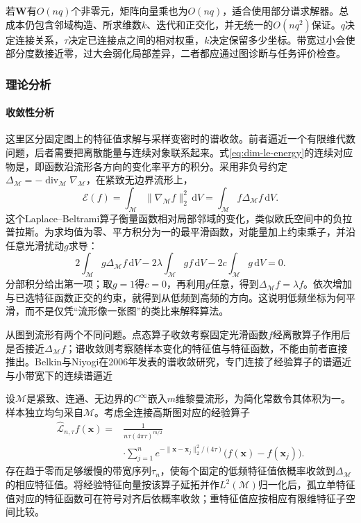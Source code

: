 若$\bm{W}$有$O(nq)$个非零元，矩阵向量乘也为$O(nq)$，适合使用部分谱求解器。总成本仍包含邻域构造、所求维数$k$、迭代和正交化，并无统一的$O(nq^2)$保证。$q$决定连接关系，$\tau$决定已连接点之间的相对权重，$k$决定保留多少坐标。带宽过小会使部分度数接近零，过大会弱化局部差异，二者都应通过图诊断与任务评价检查。

\subsubsection{理论分析}
\label{sec:dim-le-theory}

\paragraph{收敛性分析}

这里区分固定图上的特征值求解与采样变密时的谱收敛。前者逼近一个有限维代数问题，后者需要把离散能量与连续对象联系起来。式\eqref{eq:dim-le-energy}的连续对应物是，即函数沿流形各方向的变化率平方的积分。采用非负号约定$\Delta_{\mathcal{M}}=-\operatorname{div}_{\mathcal{M}}\nabla_{\mathcal{M}}$，在紧致无边界流形上，
\begin{equation}
  \label{eq:dim-dirichlet}
  \mathcal{E}(f)
  =\int_{\mathcal{M}}\lVert\nabla_{\mathcal{M}}f\rVert_2^2\,\mathrm{d}V
  =\int_{\mathcal{M}}f\Delta_{\mathcal{M}}f\,\mathrm{d}V.
\end{equation}
这个Laplace--Beltrami算子衡量函数相对局部邻域的变化，类似欧氏空间中的负拉普拉斯。为求均值为零、平方积分为一的最平滑函数，对能量加上约束乘子，并沿任意光滑扰动$g$求导：
\[
  2\int_{\mathcal{M}}g\Delta_{\mathcal{M}}f\,\mathrm{d}V
  -2\lambda\int_{\mathcal{M}}gf\,\mathrm{d}V
  -2c\int_{\mathcal{M}}g\,\mathrm{d}V=0.
\]
分部积分给出第一项；取$g=1$得$c=0$，再利用$g$任意，得到$\Delta_{\mathcal{M}}f=\lambda f$。依次增加与已选特征函数正交的约束，就得到从低频到高频的方向。这说明低频坐标为何平滑，而不是仅凭“流形像一张图”的类比来解释算法。

从图到流形有两个不同问题。点态算子收敛考察固定光滑函数$f$经离散算子作用后是否接近$\Delta_{\mathcal{M}}f$；谱收敛则考察随样本变化的特征值与特征函数，不能由前者直接推出。Belkin与Niyogi在2006年发表的谱收敛研究，专门连接了经验算子的谱逼近与小带宽下的连续谱逼近

\begin{theorem}[一种定性的谱一致性结论]
  \label{thm:dim-le-spectral}
  设$\mathcal{M}$是紧致、连通、无边界的$C^\infty$嵌入$m$维黎曼流形，为简化常数令其体积为一。样本独立均匀采自$\mathcal{M}$。考虑全连接高斯图对应的经验算子
  \[
    \begin{aligned}
      \widehat{\mathcal{L}}_{n,\tau}f(\bm{x})
      ={}&\frac{1}{n\tau(4\pi\tau)^{m/2}}\\
      &\cdot\sum_{j=1}^n
        e^{-\lVert\bm{x}-\bm{x}_j\rVert_2^2/(4\tau)}
        \bigl(f(\bm{x})-f(\bm{x}_j)\bigr).
    \end{aligned}
  \]
  存在趋于零而足够缓慢的带宽序列$\tau_n$，使每个固定的低频特征值依概率收敛到$\Delta_{\mathcal{M}}$的相应特征值。将经验特征向量按该算子延拓并作$L^2(\mathcal{M})$归一化后，孤立单特征值对应的特征函数可在符号对齐后依概率收敛；重特征值应按相应有限维特征子空间比较。
\end{theorem}

